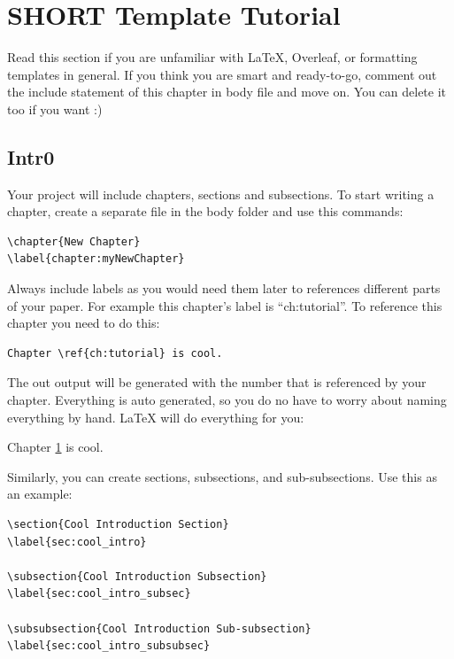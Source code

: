 
\chapter{SHORT Template Tutorial}
\label{ch:tutorial}
Read this section if you are unfamiliar with \LaTeX, Overleaf, or formatting templates in general. If you think you are smart and ready-to-go, comment out the include statement of this chapter in body file and move on. You can delete it too if you want :)

\section{Intr0}
Your project will include chapters, sections and subsections. To start writing a chapter, create a separate file in the body folder and use this commands:

\begin{verbatim}
\chapter{New Chapter}
\label{chapter:myNewChapter}
\end{verbatim}

Always include labels as you would need them later to references different parts of your paper. For example this chapter's label is ``ch:tutorial''. To reference this chapter you need to do this:

\begin{verbatim}
Chapter \ref{ch:tutorial} is cool.
\end{verbatim}

The out output will be generated with the number that is referenced by your chapter. Everything is auto generated, so you do no have to worry about naming everything by hand. \LaTeX{} will do everything for you:

Chapter \ref{ch:tutorial} is cool. 

Similarly, you can create sections, subsections, and sub-subsections. Use this as an example:

\begin{verbatim}
\section{Cool Introduction Section}
\label{sec:cool_intro}

\subsection{Cool Introduction Subsection}
\label{sec:cool_intro_subsec}

\subsubsection{Cool Introduction Sub-subsection}
\label{sec:cool_intro_subsubsec}
\end{verbatim}

